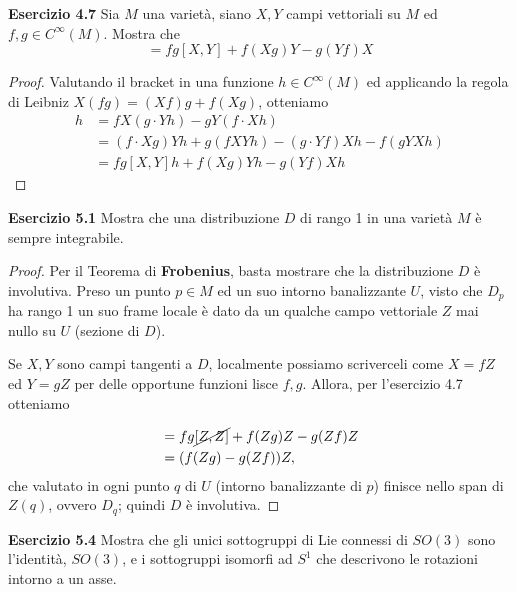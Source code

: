 \documentclass[a4paper]{article}
\theoremstyle{definition}
\theoremstyle{definition}
\theoremstyle{remark}
\theoremstyle{definition}
\begin{document}
\textbf{Esercizio 4.7}
Sia $M$ una varietà, siano $X,Y$ campi vettoriali su $M$ ed $f,g\in C^\infty(M)$. Mostra che
\begin{equation*}
    [fX,gY] = fg[X,Y] + f(Xg)Y - g(Yf)X
\end{equation*}

\begin{proof}
    Valutando il bracket in una funzione $h\in C^\infty(M)$ ed applicando la regola di Leibniz $X(fg) = (Xf)g + f(Xg)$, otteniamo
\begin{align*}
    [fX,gY]h &= fX(g\cdot Yh) - gY(f\cdot Xh) \\
    &= (f\cdot Xg)Yh + g(fXYh) - (g\cdot Yf)Xh - f(gYXh) \\
    &= fg[X,Y]h + f(Xg)Yh - g(Yf)Xh
\end{align*}
\end{proof}

\textbf{Esercizio 5.1}
Mostra che una distribuzione $D$ di rango 1 in una varietà $M$ è sempre integrabile.

\begin{proof}
    Per il Teorema di \textbf{Frobenius}, basta mostrare che la distribuzione $D$ è involutiva.
    Preso un punto $p\in M$ ed un suo intorno banalizzante $U$, visto che $D_p$ ha rango 1 un suo frame locale è dato da un qualche campo vettoriale $Z$ mai nullo su $U$ (sezione di $D$).

    Se $X,Y$ sono campi tangenti a $D$, localmente possiamo scriverceli come $X = fZ$ ed $Y = gZ$ per delle opportune funzioni lisce $f,g$. Allora, per l'esercizio 4.7 otteniamo

    \begin{align*}
        [X,Y] &= fg\cancel{[Z,Z]} + f(Zg)Z - g(Zf)Z \\
        &= (f(Zg) - g(Zf))Z,
    \end{align*}
    che valutato in ogni punto $q$ di $U$ (intorno banalizzante di $p$) finisce nello span di $Z(q)$, ovvero $D_q$; quindi $D$ è involutiva.
\end{proof}

\textbf{Esercizio 5.4}
Mostra che gli unici sottogruppi di Lie connessi di $SO(3)$ sono l'identità, $SO(3)$, e i sottogruppi isomorfi ad $S^1$ che descrivono le rotazioni intorno a un asse.
\end{document}
